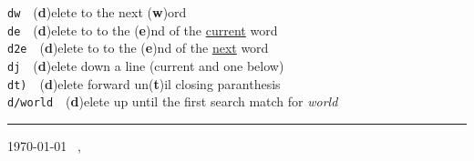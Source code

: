 \documentclass[10pt]{article} %
\newcommand{\command}[2]{#1~\dotfill{}~#2\\} %
\begin{document}
\begin{multicols}{3}
\medskip
\command{\texttt{dw}}{(\textbf{d})elete to the next (\textbf{w})ord}
\command{\texttt{de}}{(\textbf{d})elete to to the (\textbf{e})nd of the \underline{current} word}
\command{\texttt{d2e}}{(\textbf{d})elete to to the (\textbf{e})nd of the \underline{next} word}
\command{\texttt{dj}}{(\textbf{d})elete down a line (current and one below)}
\command{\texttt{dt)}}{(\textbf{d})elete forward un(\textbf{t})il closing paranthesis}
\command{\texttt{d/world}}{(\textbf{d})elete up until the first search match for \textit{world}}



\printbibliography


\hrule\medskip
\today ~ \myAuthor, \href{\myGithublink}{\myGithublink}

\end{multicols}
\end{document}
